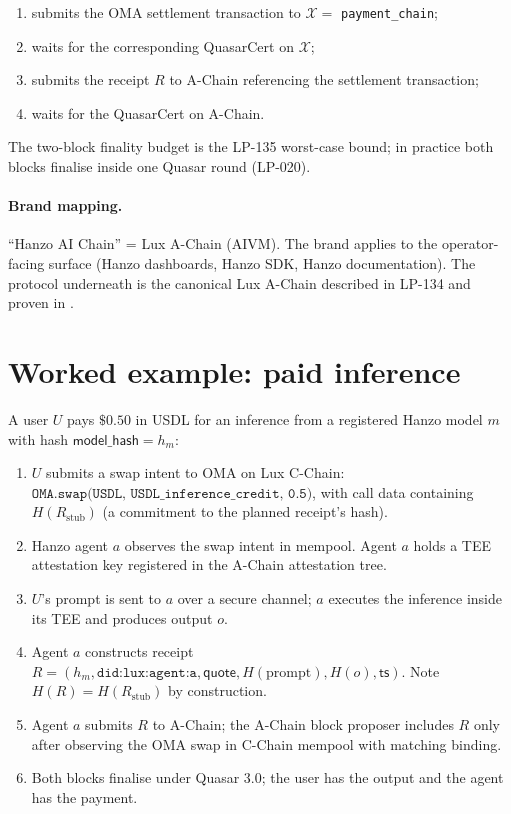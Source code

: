 \documentclass[11pt]{article}
\begin{document}
\begin{enumerate}[nosep]
  \item submits the OMA settlement transaction to
        $\mathcal{X} = $ \texttt{payment\_chain};
  \item waits for the corresponding QuasarCert on $\mathcal{X}$;
  \item submits the receipt $R$ to A-Chain referencing the
        settlement transaction;
  \item waits for the QuasarCert on A-Chain.
\end{enumerate}

The two-block finality budget is the LP-135 worst-case bound; in
practice both blocks finalise inside one Quasar round (LP-020).

\paragraph{Brand mapping.}
``Hanzo AI Chain'' = Lux A-Chain (AIVM). The brand applies to the
operator-facing surface (Hanzo dashboards, Hanzo SDK, Hanzo
documentation). The protocol underneath is the canonical Lux A-Chain
described in LP-134 and proven in \cite{quasar-cert}.

\section{Worked example: paid inference}
\label{sec:example}

A user $U$ pays $\$0.50$ in USDL for an inference from a registered
Hanzo model $m$ with hash $\mathsf{model\_hash} = h_m$:

\begin{enumerate}[nosep]
  \item $U$ submits a swap intent to OMA on Lux C-Chain:
        $\texttt{OMA.swap(USDL, USDL\_inference\_credit, 0.5)}$,
        with call data containing $H(R_{\mathrm{stub}})$ (a
        commitment to the planned receipt's hash).
  \item Hanzo agent $a$ observes the swap intent in mempool. Agent
        $a$ holds a TEE attestation key registered in the A-Chain
        attestation tree.
  \item $U$'s prompt is sent to $a$ over a secure channel; $a$
        executes the inference inside its TEE and produces output
        $o$.
  \item Agent $a$ constructs receipt
        $R = (h_m, \texttt{did:lux:agent:a}, \mathsf{quote},
              H(\mathrm{prompt}), H(o), \mathsf{ts})$.
        Note $H(R) = H(R_{\mathrm{stub}})$ by construction.
  \item Agent $a$ submits $R$ to A-Chain; the A-Chain block proposer
        includes $R$ only after observing the OMA swap in C-Chain
        mempool with matching binding.
  \item Both blocks finalise under Quasar 3.0; the user has the
        output and the agent has the payment.
\end{enumerate}
\end{document}
